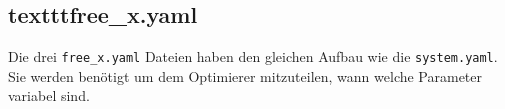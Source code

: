   \subsection{texttt{free\_x.yaml}} Die drei \texttt{free\_x.yaml} Dateien haben den 
    gleichen Aufbau wie die \texttt{system.yaml}. Sie werden benötigt um dem 
    Optimierer mitzuteilen, wann welche Parameter variabel sind.










%
